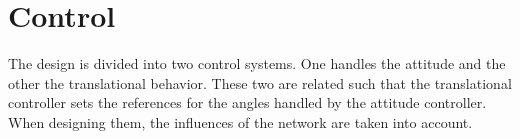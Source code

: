 \section{Control}\label{sec:control}
The design is divided into two control systems. One handles the attitude and the other the translational behavior. These two are related such that the translational controller sets the references for the angles handled by the attitude controller. When designing them, the influences of the network are taken into account.